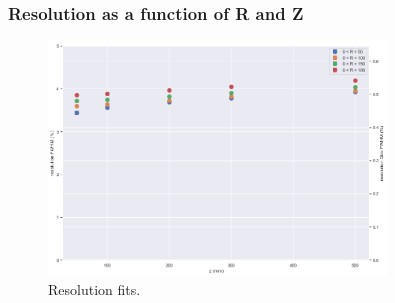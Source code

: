 \begin{frame}
\frametitle{Resolution as a function of R and Z}
\begin{figure}
  \begin{center}
      \includegraphics[width=0.8\textwidth]{img/r6581/ResoVsZR.png}
    \caption{Resolution fits.}
  \end{center}
\end{figure}
\end{frame}





